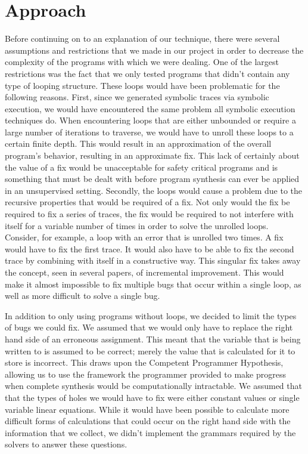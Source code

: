 \documentclass[]{article}
\begin{document}
\section{Approach}
Before continuing on to an explanation of our technique, there were several
assumptions and restrictions that we made in our project in order to
decrease the complexity of the programs with which we were dealing.  One of
the largest restrictions was the fact that we only tested programs that
didn't contain any type of looping structure.  These loops would have been
problematic for the following reasons.  First, since we generated symbolic
traces via symbolic execution, we would have encountered the same problem
all symbolic execution techniques do.  When encountering loops that are
either unbounded or require a large number of iterations to traverse, we
would have to unroll these loops to a certain finite depth.  This would
result in an approximation of the overall program's behavior, resulting in
an approximate fix.  This lack of certainly about the value of a fix would
be unacceptable for safety critical programs and is something that must be
dealt with before program synthesis can ever be applied in an unsupervised
setting.  Secondly, the loops would cause a problem due to the recursive
properties that would be required of a fix.  Not only would the fix be
required to fix a series of traces, the fix would be required to not
interfere with itself for a variable number of times in order to solve the
unrolled loops.  Consider, for example, a loop with an error that is unrolled
two times.  A fix would have to fix the first trace.  It would also have to be
able to fix the second trace by combining with itself in a constructive way.
This singular fix takes away the concept, seen in several papers, of
incremental improvement.  This would make it almost impossible to fix
multiple bugs that occur within a single loop, as well as more difficult to
solve a single bug.

In addition to only using programs without loops, we decided to limit the
types of bugs we could fix.  We assumed that we would only have to replace
the right hand side of an erroneous assignment.  This meant that the
variable that is being written to is assumed to be correct; merely the value
that is calculated for it to store is incorrect.  This draws upon the
Competent Programmer Hypothesis, allowing us to use the framework the
programmer provided to make progress when complete synthesis would be
computationally intractable.  We assumed that that the types of holes we
would have to fix were either constant values or single variable linear
equations.  While it would have been possible to calculate more difficult
forms of calculations that could occur on the right hand side with the
information that we collect, we didn't implement the grammars required by
the solvers to answer these questions.
\end{document}
